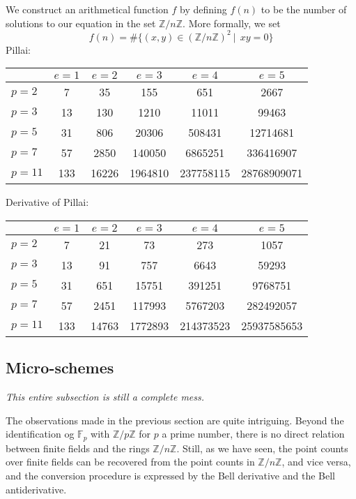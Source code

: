 \documentclass[a4paper]{article}
\theoremstyle{definition}
\theoremstyle{remark}
\newcommand{\Z}{\mathbb{Z}}
\begin{document}
We construct an arithmetical function $f$ by defining $f(n)$ to be the number of solutions to our equation in the set $\Z / n \Z$. More formally, we set
$$  f(n) = \# \{  (x, y) \in (\Z / n \Z)^2 \  \vert \ \   xy = 0   \}   $$
Pillai:
\begin{table}[h]
\centering
\begin{tabular}{| l | | c | c | c | c | c |}
\hline
& $e = 1$ & $e = 2$ & $e = 3$ & $e = 4$ & $e = 5$\\
\hline
\hline
$p = 2$ & 7 & 35 & 155 & 651 & 2667 \\
\hline
$p = 3$ & 13 & 130 & 1210 & 11011 & 99463 \\
\hline
$p = 5$ & 31 & 806 & 20306 & 508431 & 12714681 \\
\hline
$p = 7$ & 57 & 2850 & 140050 & 6865251 & 336416907 \\
\hline
$p = 11$ & 133 & 16226 & 1964810 & 237758115 & 28768909071 \\
\hline
\end{tabular}
\end{table}

Derivative of Pillai:
\begin{table}[h]
\centering
\begin{tabular}{| l | | c | c | c | c | c |}
\hline
& $e = 1$ & $e = 2$ & $e = 3$ & $e = 4$ & $e = 5$\\
\hline
\hline
$p = 2$ & 7 & 21 & 73 & 273 & 1057 \\
\hline
$p = 3$ & 13 & 91 & 757 & 6643 & 59293 \\
\hline
$p = 5$ & 31 & 651 & 15751 & 391251 & 9768751 \\
\hline
$p = 7$ & 57 & 2451 & 117993 & 5767203 & 282492057 \\
\hline
$p = 11$ & 133 & 14763 & 1772893 & 214373523 & 25937585653 \\
\hline
\end{tabular}
\end{table}




\subsection{Micro-schemes}


\emph{This entire subsection is still a complete mess.}

The observations made in the previous section are quite intriguing. Beyond the identification og $\mathbb{F}_p$ with $\mathbb{Z} / p \mathbb{Z}$ for $p$ a prime number, there is no direct relation between finite fields and the rings $\Z / n \Z$. Still, as we have seen, the point counts over finite fields can be recovered from the point counts in $\Z / n \Z$, and vice versa, and the conversion procedure is expressed by the Bell derivative and the Bell antiderivative.
\end{document}
